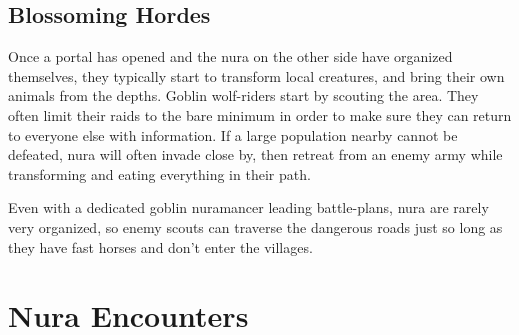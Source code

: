\begin{multicols}{2}
\subsection{Blossoming Hordes}
Once a portal has opened and the nura on the other side have organized themselves, they typically start to transform local creatures, and bring their own animals from the depths.
Goblin wolf-riders start by scouting the area.
They often limit their raids to the bare minimum in order to make sure they can return to everyone else with information.
If a large population nearby cannot be defeated, nura will often invade close by, then retreat from an enemy army while transforming and eating everything in their path.

Even with a dedicated goblin nuramancer leading battle-plans, nura are rarely very organized, so enemy scouts can traverse the dangerous roads just so long as they have fast horses and don't enter the villages.

\end{multicols}

\section{Nura Encounters}

